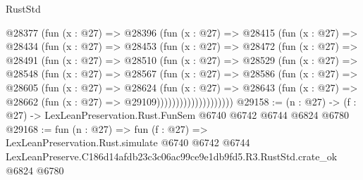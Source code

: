 \begin{lexlean}{RustStd}
\begin{coremodule}
          @28377
            (fun (x : @27) =>
            @28396
              (fun (x : @27) =>
              @28415
                (fun (x : @27) =>
                @28434
                  (fun (x : @27) =>
                  @28453
                    (fun (x : @27) =>
                    @28472
                      (fun (x : @27) =>
                      @28491
                        (fun (x : @27) =>
                        @28510
                          (fun (x : @27) =>
                          @28529
                            (fun (x : @27) =>
                            @28548
                              (fun (x : @27) =>
                              @28567
                                (fun (x : @27) =>
                                @28586
                                  (fun (x : @27) =>
                                  @28605
                                    (fun (x : @27) =>
                                    @28624
                                      (fun (x : @27) =>
                                      @28643
                                        (fun (x : @27) =>
                                        @28662 (fun (x : @27) => @29109))))))))))))))))))))
@29158 := (n : @27) -> (f : @27) -> LexLeanPreservation.Rust.FunSem @6740 @6742 @6744 @6824 @6780
@29168 := fun (n : @27) =>
  fun (f : @27) =>
  LexLeanPreservation.Rust.simulate
    @6740
    @6742
    @6744
    LexLeanPreserve.C186d14afdb23c3c06ac99ce9e1db9fd5.R3.RustStd.crate_ok
    @6824
    @6780
\end{coremodule}
\end{lexlean}
